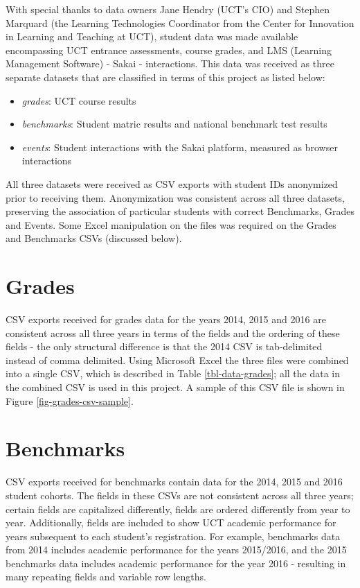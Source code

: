 With special thanks to data owners Jane Hendry (UCT's CIO) and Stephen Marquard (the Learning Technologies Coordinator from the Center for Innovation in Learning and Teaching at UCT), student data was made available encompassing UCT entrance assessments, course grades, and LMS (Learning Management Software) - Sakai \cite{xxx} - interactions. This data was received as three separate datasets that are classified in terms of this project as listed below:

\begin{itemize}
    \item \textit{grades}: UCT course results
    \item \textit{benchmarks}: Student matric results and national benchmark test results
    \item \textit{events}: Student interactions with the Sakai platform, measured as browser interactions
\end{itemize}

All three datasets were received as CSV exports with student IDs anonymized prior to receiving them. Anonymization was consistent across all three datasets, preserving the association of particular students with correct Benchmarks, Grades and Events. Some Excel manipulation on the files was required on the Grades and Benchmarks CSVs (discussed below).

\section{Grades}
CSV exports received for grades data for the years 2014, 2015 and 2016 are consistent across all three years in terms of the fields and the ordering of these fields - the only structural difference is that the 2014 CSV is tab-delimited instead of comma delimited. Using Microsoft Excel the three files were combined into a single CSV, which is described in Table \ref{tbl-data-grades}; all the data in the combined CSV is used in this project. A sample of this CSV file is shown in Figure \ref{fig-grades-csv-sample}.




\section{Benchmarks}
CSV exports received for benchmarks contain data for the 2014, 2015 and 2016 student cohorts. The fields in these CSVs are not consistent across all three years; certain fields are capitalized differently, fields are ordered differently from year to year. Additionally, fields are included to show UCT academic performance for years subsequent to each student's registration. For example, benchmarks data from 2014 includes academic performance for the years 2015/2016, and the 2015 benchmarks data includes academic performance for the year 2016 - resulting in many repeating fields and variable row lengths.

